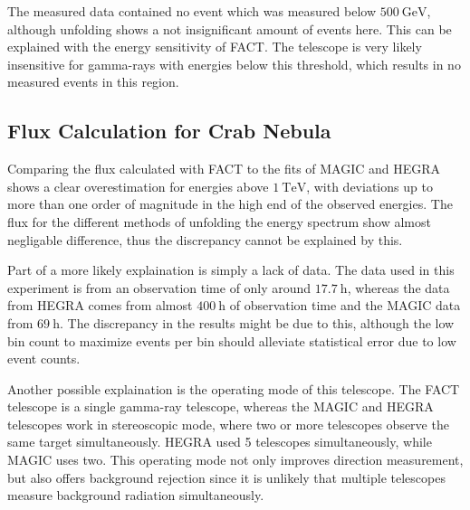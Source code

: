             The measured data contained no event which was measured below $\SI{500}{\giga\electronvolt}$, although unfolding shows a not insignificant amount of events here.
            This can be explained with the energy sensitivity of FACT.
            The telescope is very likely insensitive for gamma-rays with energies below this threshold, which results in no measured events in this region.
        \subsection{Flux Calculation for Crab Nebula}
            Comparing the flux calculated with FACT to the fits of MAGIC and HEGRA shows a clear overestimation for energies above $\SI{1}{\tera\electronvolt}$, with deviations up to more than one order of magnitude in the high end of the observed energies.
            The flux for the different methods of unfolding the energy spectrum show almost negligable difference, thus the discrepancy cannot be explained by this.

            Part of a more likely explaination is simply a lack of data.
            The data used in this experiment is from an observation time of only around $\SI{17.7}{\hour}$, whereas the data from HEGRA comes from almost $\SI{400}{\hour}$ of observation time and the MAGIC data from $\SI{69}{\hour}$.
            The discrepancy in the results might be due to this, although the low bin count to maximize events per bin should alleviate statistical error due to low event counts.

            Another possible explaination is the operating mode of this telescope.
            The FACT telescope is a single gamma-ray telescope, whereas the MAGIC and HEGRA telescopes work in stereoscopic mode, where two or more telescopes observe the same target simultaneously.
            HEGRA used 5 telescopes simultaneously, while MAGIC uses two.
            This operating mode not only improves direction measurement, but also offers background rejection since it is unlikely that multiple telescopes measure background radiation simultaneously.
            

\newpage
\printbibliography
